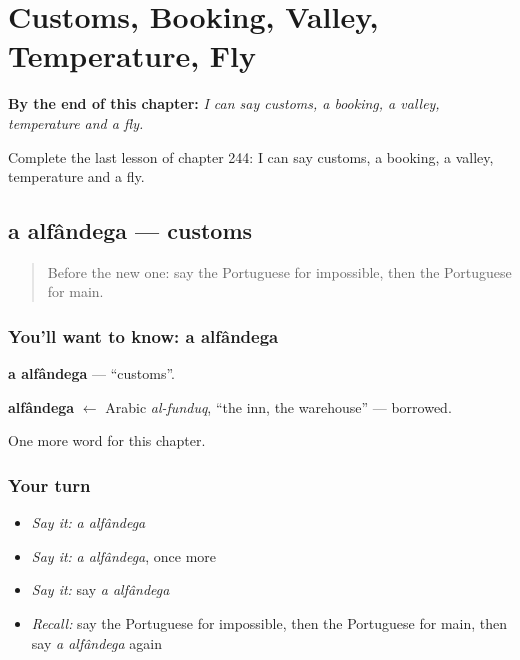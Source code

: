 
\chapter{Customs, Booking, Valley, Temperature, Fly}
\label{ch:pt-customs-booking-valley-temperature-fly}

\begin{chapteropening}
\textbf{By the end of this chapter:} \emph{I can say customs, a booking, a valley, temperature and a fly.}

Complete the last lesson of chapter 244: I can say customs, a booking, a valley, temperature and a fly.
\end{chapteropening}

\section[a alfândega]{a alfândega — customs}

\label{lesson:PT-C244-alfandega}



\begin{quote}
Before the new one: say the Portuguese for impossible, then the Portuguese for main.
\end{quote}

\subsection*{You'll want to know: a alfândega}
\textbf{a alfândega} — \textquotedblleft{}customs\textquotedblright{}.

\begin{cousinweb}
\textbf{alfândega} $\leftarrow$ Arabic \emph{al-funduq}, \textquotedblleft{}the inn, the warehouse\textquotedblright{} — borrowed.
\end{cousinweb}

\begin{grammarlens}[title={What you've built}]
One more word for this chapter.
\end{grammarlens}

\subsection*{Your turn}
\begin{itemize}
\raggedright
  \item \emph{Say it:} \emph{a alfândega}
  \item \emph{Say it:} \emph{a alfândega}, once more
  \item \emph{Say it:} say \emph{a alfândega}
  \item \emph{Recall:} say the Portuguese for impossible, then the Portuguese for main, then say \emph{a alfândega} again
\end{itemize}

